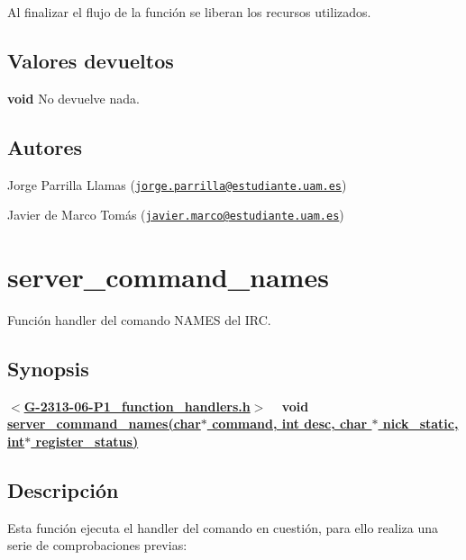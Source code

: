 Al finalizar el flujo de la función se liberan los recursos utilizados.\hypertarget{server_command_part_return_part}{}\subsection{Valores devueltos}\label{server_command_part_return_part}

\begin{DoxyItemize}
\item {\bfseries void} No devuelve nada. 
\end{DoxyItemize}\hypertarget{server_command_part_authors_part}{}\subsection{Autores}\label{server_command_part_authors_part}

\begin{DoxyItemize}
\item Jorge Parrilla Llamas (\href{mailto:jorge.parrilla@estudiante.uam.es}{\tt jorge.\+parrilla@estudiante.\+uam.\+es}) 
\item Javier de Marco Tomás (\href{mailto:javier.marco@estudiante.uam.es}{\tt javier.\+marco@estudiante.\+uam.\+es}) 
\end{DoxyItemize}\hypertarget{server_command_names}{}\section{server\+\_\+command\+\_\+names}\label{server_command_names}
Función handler del comando N\+A\+M\+ES del I\+RC.\hypertarget{server_command_names_synopsis_names}{}\subsection{Synopsis}\label{server_command_names_synopsis_names}
{ {\bfseries $<$\hyperlink{G-2313-06-P1__function__handlers_8h}{G-\/2313-\/06-\/\+P1\+\_\+function\+\_\+handlers.\+h}$>$} ~\newline
 {\bfseries void \hyperlink{G-2313-06-P1__function__handlers_8c_a0fe05d80af27ae220f8fa631468606ea}{server\+\_\+command\+\_\+names(char$\ast$ command, int desc, char $\ast$ nick\+\_\+static, int$\ast$ register\+\_\+status)}} } \hypertarget{server_command_names_descripcion_names}{}\subsection{Descripción}\label{server_command_names_descripcion_names}
Esta función ejecuta el handler del comando en cuestión, para ello realiza una serie de comprobaciones previas\+:


